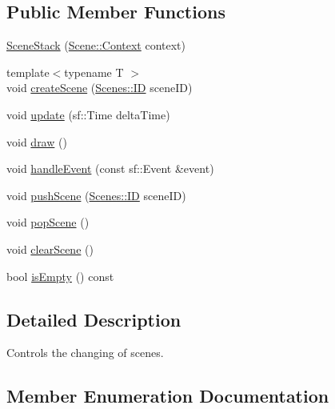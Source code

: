 \subsection*{Public Member Functions}
\begin{DoxyCompactItemize}
\item 
\hyperlink{class_scene_stack_a7893580d1266ed06c9c690012137f799}{Scene\+Stack} (\hyperlink{struct_scene_1_1_context}{Scene\+::\+Context} context)
\item 
{\footnotesize template$<$typename T $>$ }\\void \hyperlink{class_scene_stack_a129b49c7bc280aeaf7c71235b3d9648d}{create\+Scene} (\hyperlink{namespace_scenes_a0ad7ab6856b1d77d498e3a251f6bb275}{Scenes\+::\+ID} scene\+ID)
\item 
void \hyperlink{class_scene_stack_acdea2588bbc85c2834608ebab6671866}{update} (sf\+::\+Time delta\+Time)
\item 
void \hyperlink{class_scene_stack_ab4a68b2247289ba1d934067aad35159d}{draw} ()
\item 
void \hyperlink{class_scene_stack_aecf75add55f527c31528043f4b28db44}{handle\+Event} (const sf\+::\+Event \&event)
\item 
void \hyperlink{class_scene_stack_a41366819a998558e3920fe7859d1f114}{push\+Scene} (\hyperlink{namespace_scenes_a0ad7ab6856b1d77d498e3a251f6bb275}{Scenes\+::\+ID} scene\+ID)
\item 
void \hyperlink{class_scene_stack_a0ea3309f9ec9120cf51a0bce3881e1e2}{pop\+Scene} ()
\item 
void \hyperlink{class_scene_stack_a70253c72c07f5d5c5d77861d064b8470}{clear\+Scene} ()
\item 
bool \hyperlink{class_scene_stack_ade95cce69229a18d169f63093289e865}{is\+Empty} () const
\end{DoxyCompactItemize}


\subsection{Detailed Description}
Controls the changing of scenes. 



\subsection{Member Enumeration Documentation}
\mbox{\label{class_scene_stack_ab8644e038aad992c6776dc3fb5fcc1f9}} 
